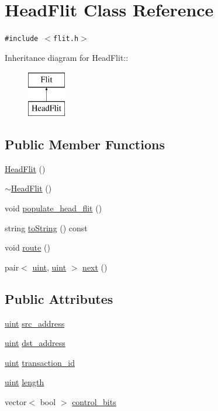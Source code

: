 \hypertarget{classHeadFlit}{
\section{HeadFlit Class Reference}
\label{classHeadFlit}
}
{\tt \#include $<$flit.h$>$}

Inheritance diagram for HeadFlit::\begin{figure}[H]
\begin{center}
\leavevmode
\includegraphics[height=2cm]{classHeadFlit}
\end{center}
\end{figure}
\subsection*{Public Member Functions}
\begin{CompactItemize}
\item 
\hyperlink{classHeadFlit_f7e40d1eb615c1950daec0044e103d14}{HeadFlit} ()
\item 
\hyperlink{classHeadFlit_baed314fc6d83dc45b11bc8154de9060}{$\sim$HeadFlit} ()
\item 
void \hyperlink{classHeadFlit_6a0b5e2ddf99c2722b2d06ca103707f8}{populate\_\-head\_\-flit} ()
\item 
string \hyperlink{classHeadFlit_4d22ac839cad2ac7ef0aedfeb54c9421}{toString} () const 
\item 
void \hyperlink{classHeadFlit_45b1f981d63ba53d1814250cc7efa9a4}{route} ()
\item 
pair$<$ \hyperlink{outputBuffer_8h_91ad9478d81a7aaf2593e8d9c3d06a14}{uint}, \hyperlink{outputBuffer_8h_91ad9478d81a7aaf2593e8d9c3d06a14}{uint} $>$ \hyperlink{classHeadFlit_ad973bdd54d38ac2a5ad05e27d3066f1}{next} ()
\end{CompactItemize}
\subsection*{Public Attributes}
\begin{CompactItemize}
\item 
\hyperlink{outputBuffer_8h_91ad9478d81a7aaf2593e8d9c3d06a14}{uint} \hyperlink{classHeadFlit_d7e8fd576ead55e392185a75da63aca1}{src\_\-address}
\item 
\hyperlink{outputBuffer_8h_91ad9478d81a7aaf2593e8d9c3d06a14}{uint} \hyperlink{classHeadFlit_1c5bf74e402bfa95645fb9cb4d188798}{dst\_\-address}
\item 
\hyperlink{outputBuffer_8h_91ad9478d81a7aaf2593e8d9c3d06a14}{uint} \hyperlink{classHeadFlit_4dd44bd07942e1eeace24cae293beb5a}{transaction\_\-id}
\item 
\hyperlink{outputBuffer_8h_91ad9478d81a7aaf2593e8d9c3d06a14}{uint} \hyperlink{classHeadFlit_b506d4907576fce81b277b30995e9867}{length}
\item 
vector$<$ bool $>$ \hyperlink{classHeadFlit_96e3a75d0e2d04fb465e4b7463e7325e}{control\_\-bits}
\end{CompactItemize}


